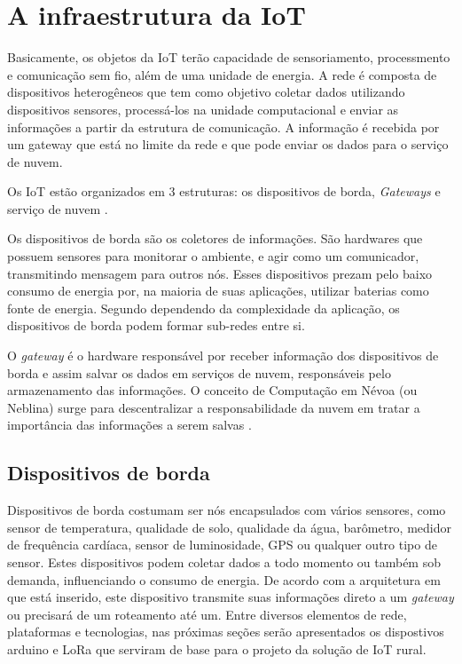 \documentclass[
    hidelinks,
	12pt,				%
	openany,
	oneside, 
	a4paper,			%
	english,			%
	french,				%
	spanish,			%
	brazil				%
	]{abntex2}
\begin{document}
\section{A infraestrutura da IoT} \label{infra}
\label{infraIoT}
Basicamente, os objetos da IoT terão capacidade de sensoriamento, processmento e comunicação sem fio, além de uma unidade de energia. A rede é composta de dispositivos heterogêneos que tem como objetivo coletar dados utilizando dispositivos sensores, processá-los na unidade computacional e enviar as informações a partir da estrutura de comunicação. A informação é recebida por um gateway que está no limite da rede e que pode enviar os dados para o serviço de nuvem. 

Os IoT estão organizados em 3 estruturas: os dispositivos de borda, \textit{Gateways} e serviço de nuvem \cite{ray2016introIoT}. 

Os dispositivos de borda são os coletores de informações. São hardwares que possuem sensores para monitorar o ambiente, e agir como um comunicador, transmitindo mensagem para outros nós. Esses dispositivos prezam pelo baixo consumo de energia por, na maioria de suas aplicações, utilizar baterias como fonte de energia. Segundo \cite{ray2016introIoT} dependendo da complexidade da aplicação, os dispositivos de borda podem formar sub-redes entre si. 

O \textit{gateway} é o hardware responsável por receber informação dos dispositivos de borda e assim salvar os dados em serviços de nuvem, responsáveis pelo armazenamento das informações. O conceito de Computação em Névoa (ou Neblina) surge para descentralizar a responsabilidade da nuvem em tratar a importância das informações a serem salvas \cite{MihaiDraganaStamatescuPopescuIchim2018}.


\subsection{Dispositivos de borda}

Dispositivos de borda costumam ser nós encapsulados com vários sensores, como sensor de temperatura, qualidade de solo, qualidade da água, barômetro, medidor de frequência cardíaca, sensor de luminosidade, GPS ou qualquer outro tipo de sensor. Estes dispositivos podem coletar dados a todo momento ou também sob demanda, influenciando o consumo de energia. De acordo com a arquitetura em que está inserido, este dispositivo transmite suas informações direto a um \textit{gateway} ou precisará de um roteamento até um. Entre diversos elementos de rede, plataformas e tecnologias, nas próximas seções serão apresentados os dispostivos arduino e LoRa que serviram de base para o projeto da solução de IoT rural. 
\end{document}
